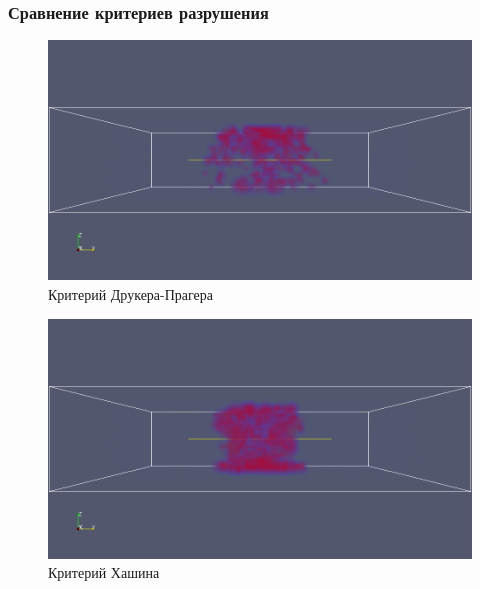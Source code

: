 \documentclass[xcolor={usenames,dvipsnames,svgnames,table}]{beamer}
\begin{document}
\begin{frame}
    \frametitle{Сравнение критериев разрушения}
    \vspace{-2.5em}
    \begin{center}
        \begin{minipage}[h]{0.33\textwidth}
            \begin{figure}[h]
                \includegraphics[width=\textwidth]{png/destruction/x-drpr-x-.png}
                \tiny
                \caption{Критерий Друкера-Прагера}
            \end{figure}
        \end{minipage}
        \begin{minipage}[h]{0.33\textwidth}
            \begin{figure}[h]
                \includegraphics[width=\textwidth]{png/destruction/x-hashin-x-.png}
                \tiny
                \caption{Критерий Хашина}
            \end{figure}
        \end{minipage}
        \begin{minipage}[h]{0.33\textwidth}

\end{minipage}
\end{center}
\end{frame}
\end{document}
